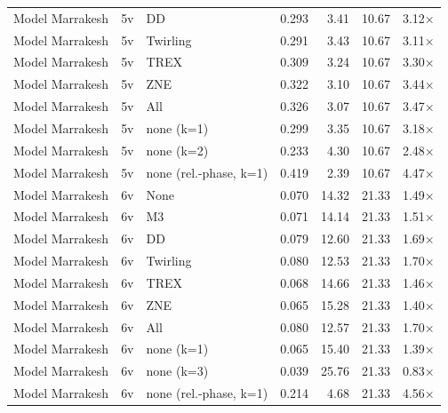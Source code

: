 \begin{table}[t]
\begin{tabular}{lllrrrr}
Model Marrakesh & 5v & DD & 0.293 & 3.41 & 10.67 & 3.12× \\
Model Marrakesh & 5v & Twirling & 0.291 & 3.43 & 10.67 & 3.11× \\
Model Marrakesh & 5v & TREX & 0.309 & 3.24 & 10.67 & 3.30× \\
Model Marrakesh & 5v & ZNE & 0.322 & 3.10 & 10.67 & 3.44× \\
Model Marrakesh & 5v & All & 0.326 & 3.07 & 10.67 & 3.47× \\
Model Marrakesh & 5v & none (k=1) & 0.299 & 3.35 & 10.67 & 3.18× \\
Model Marrakesh & 5v & none (k=2) & 0.233 & 4.30 & 10.67 & 2.48× \\
Model Marrakesh & 5v & none (rel.-phase, k=1) & 0.419 & 2.39 & 10.67 & 4.47× \\
Model Marrakesh & 6v & None & 0.070 & 14.32 & 21.33 & 1.49× \\
Model Marrakesh & 6v & M3 & 0.071 & 14.14 & 21.33 & 1.51× \\
Model Marrakesh & 6v & DD & 0.079 & 12.60 & 21.33 & 1.69× \\
Model Marrakesh & 6v & Twirling & 0.080 & 12.53 & 21.33 & 1.70× \\
Model Marrakesh & 6v & TREX & 0.068 & 14.66 & 21.33 & 1.46× \\
Model Marrakesh & 6v & ZNE & 0.065 & 15.28 & 21.33 & 1.40× \\
Model Marrakesh & 6v & All & 0.080 & 12.57 & 21.33 & 1.70× \\
Model Marrakesh & 6v & none (k=1) & 0.065 & 15.40 & 21.33 & 1.39× \\
Model Marrakesh & 6v & none (k=3) & 0.039 & 25.76 & 21.33 & 0.83× \\
Model Marrakesh & 6v & none (rel.-phase, k=1) & 0.214 & 4.68 & 21.33 & 4.56× \\
\bottomrule
\end{tabular}
\end{table}
